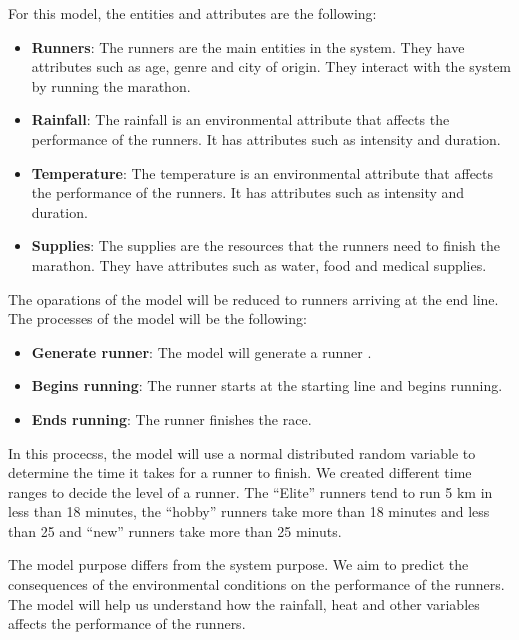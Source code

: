 \documentclass[conference]{IEEEtran}
\begin{document}
For this model, the entities and attributes are the following:

\begin{itemize}
    \item \textbf{Runners}: The runners are the main entities in the system. They have attributes such as age, genre and city of origin. They interact with the system by running the marathon.
    \item \textbf{Rainfall}: The rainfall is an environmental attribute that affects the performance of the runners. It has attributes such as intensity and duration.
    \item \textbf{Temperature}: The temperature is an environmental attribute that affects the performance of the runners. It has attributes such as intensity and duration.
    \item \textbf{Supplies}: The supplies are the resources that the runners need to finish the marathon. They have attributes such as water, food and medical supplies.
\end{itemize}

The oparations of the model will be reduced to runners arriving at the end line. The processes of the model will be the following:
\begin{itemize}
    \item \textbf{Generate runner}: The model will generate a runner .
    \item \textbf{Begins running}: The runner starts at the starting line and begins running.
    \item \textbf{Ends running}: The runner finishes the race.
\end{itemize}

In this procecss, the model will use a normal distributed random variable to determine the time it takes for a runner to finish. We created different time ranges to decide the level of a runner. The ``Elite'' runners tend to run 5 km in less than 18 minutes, the ``hobby'' runners take more than 18 minutes and less than 25 and ``new'' runners take more than 25 minuts.

The model purpose differs from the system purpose. We aim to predict the consequences of the environmental conditions on the performance of the runners. The model will help us understand how the rainfall, heat and other variables affects the performance of the runners.


\end{document}
